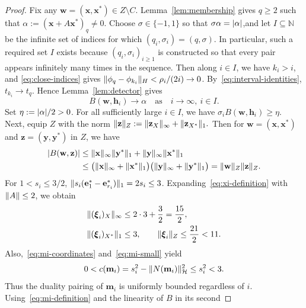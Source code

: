\documentclass[11pt,a4paper]{article}
\theoremstyle{reportstyle}
\numberwithin{equation}{section}
\newcommand{\NN}{\mathbb N}
\newcommand{\HH}{\mathcal H}
\newcommand{\bx}{\mathbf x}
\newcommand{\by}{\mathbf y}
\newcommand{\be}{\mathbf e}
\newcommand{\bz}{\mathbf z}
\newcommand{\bm}{\mathbf m}
\newcommand{\bw}{\mathbf w}
\newcommand{\bh}{\mathbf h}
\newcommand{\bxi}{\boldsymbol\xi}
\DeclarePairedDelimiter{\norm}{\lVert}{\rVert}
\DeclarePairedDelimiter{\abs}{\lvert}{\rvert}
\begin{document}
	\begin{proof}
		Fix any $\bw=(\bx,\bx^*)\in Z\setminus C$.
		Lemma~\ref{lem:membership} gives $q\ge2$ such that $\alpha:= (\bx + A\bx^*)_q \ne0.$ Choose $\sigma\in\{-1,1\}$ so that $\sigma\alpha=\abs{\alpha}$,and let $I\subseteq\NN$ be the infinite set of indices for which
		$(q_i,\sigma_i)=(q,\sigma)$. In particular, such a required set $I$ exists because $(q_i,\sigma_i)_{i\geq1}$ is constructed so that every pair appears infinitely many times in the sequence. Then along $i\in I$, we have $k_i>i$, and \eqref{eq:close-indices} gives
		$\norm{\phi_q-\phi_{k_i}}_H<\rho_i/(2i)\to0$. By~\eqref{eq:interval-identities}, $t_{k_i}\to t_q$. Hence
		Lemma~\ref{lem:detector} gives
		$$ B(\bw,\bh_i) \rightarrow \alpha \quad \mbox{as} \quad i\to\infty,\ i\in I. $$
		Set $\eta:=\abs{\alpha}/2>0$. For all sufficiently large $i\in I$, we have $\sigma_i B(\bw,\bh_i)\ge\eta$. Next, equip $Z$ with the norm $\norm{\bz}_Z := \norm{\bz_X}_\infty + \norm{\bz_{X^*}}_1.$ Then for $\bw=(\bx,\bx^*)$ and $\bz=(\by,\by^*)$ in $Z$, we have
		\begin{equation*}
			\begin{aligned}
				\abs{B(\bw,\bz)} & \le \norm{\bx}_\infty \norm{\by^*}_1 + \norm{\by}_\infty\norm{\bx^*}_1\\ &\le\bigl(\norm{\bx}_\infty+\norm{\bx^*}_1\bigr) \bigl(\norm{\by}_\infty + \norm{\by^*}_1\bigr) = \norm{\bw}_Z \norm{\bz}_Z.
			\end{aligned}
		\end{equation*}
		For $1<s_i\le3/2$,	$\norm{s_i(\be_1^* - \be_{r_i}^*)}_1 = 2s_i\le3$.
		Expanding~\eqref{eq:xi-definition} with $\norm{A}\le2$, we obtain
		\begin{equation*}
			\begin{aligned}
				\norm{(\bxi_i)_X}_\infty
				&\le2\cdot3+\frac32=\frac{15}{2},\\
				\norm{(\bxi_i)_{X^*}}_1&\le3,
				\qquad
				\norm{\bxi_i}_Z\le\frac{21}{2}<11.
			\end{aligned}
		\end{equation*}
		Also,~\eqref{eq:mi-coordinates} and~\eqref{eq:mi-small} yield
		\begin{equation*}
			0<c(\bm_i)=s_i^2-\norm{N(\bm_i)}_{\HH}^2
			\le s_i^2 <3.
		\end{equation*}
		Thus the duality pairing of $\bm_i$ is uniformly bounded regardless of $i$. Using~\eqref{eq:mi-definition} and the linearity of $B$ in its second

\end{proof}
\end{document}
